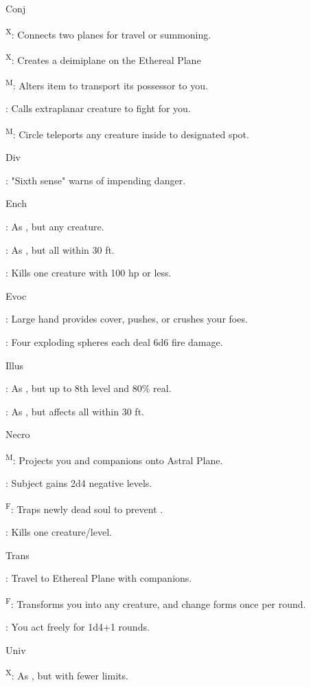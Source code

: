 Conj

\textsuperscript{X}: Connects two planes for travel or summoning.

\textsuperscript{X}: Creates a deimiplane on the Ethereal Plane

\textsuperscript{M}: Alters item to transport its possessor to you.

: Calls extraplanar creature to fight for you.

\textsuperscript{M}: Circle teleports any creature inside to designated spot.

Div

: "Sixth sense" warns of impending danger.

Ench

: As , but any creature.

: As , but all within 30 ft.

: Kills one creature with 100 hp or less.

Evoc

: Large hand provides cover, pushes, or crushes your foes.

: Four exploding spheres each deal 6d6 fire damage.

Illus

: As , but up to 8th level and 80\% real.

: As , but affects all within 30 ft.

Necro

\textsuperscript{M}: Projects you and companions onto Astral Plane.

: Subject gains 2d4 negative levels.

\textsuperscript{F}: Traps newly dead soul to prevent .

: Kills one creature/level.

Trans

: Travel to Ethereal Plane with companions.

\textsuperscript{F}: Transforms you into any creature, and change forms once per round.

: You act freely for 1d4+1 rounds.

Univ

\textsuperscript{X}: As , but with fewer limits.
